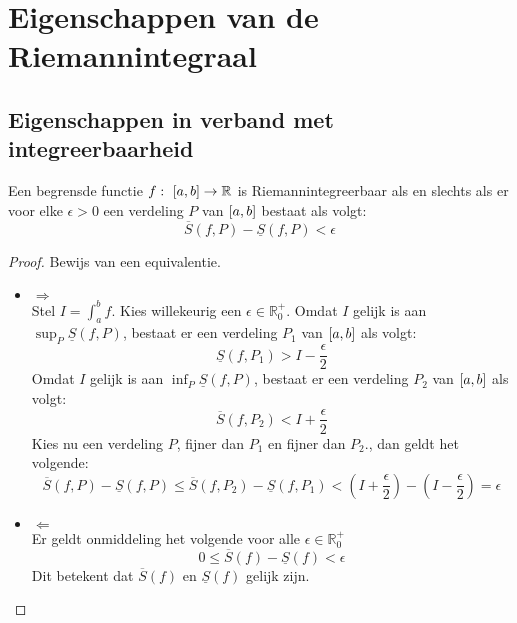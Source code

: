 \documentclass[main.tex]{subfiles}
\begin{document}
\section{Eigenschappen van de Riemannintegraal}
\label{sec:eigenschappen-van-de}

\subsection{Eigenschappen in verband met integreerbaarheid}
\label{sec:eigensch-verb-met}

\begin{bpr}
  \label{pr:integreerbaar-itv-verdelingen}
  Een begrensde functie $f:\ \interval{a}{b} \rightarrow \mathbb{R}$ is Riemannintegreerbaar als en slechts als er voor elke $\epsilon > 0$ een verdeling $P$ van $\interval{a}{b}$ bestaat als volgt:
  \[ \overline{S}(f,P) - \underline{S}(f,P) < \epsilon \]

  \begin{proof}
    Bewijs van een equivalentie.
    \begin{itemize}
    \item $\Rightarrow$\\
      Stel $I = \int_{a}^{b}f$.
      Kies willekeurig een $\epsilon\in\mathbb{R}_{0}^{+}$.
      Omdat $I$ gelijk is aan $\sup_{P}\underline{S}(f,P)$, bestaat er een verdeling $P_{1}$ van $\interval{a}{b}$ als volgt:
      \[ \underline{S}(f,P_{1}) > I-\frac{\epsilon}{2} \]
      Omdat $I$ gelijk is aan $\inf_{P}\underline{S}(f,P)$, bestaat er een verdeling $P_{2}$ van $\interval{a}{b}$ als volgt:
      \[ \overline{S}(f,P_{2}) < I+\frac{\epsilon}{2} \]
      Kies nu een verdeling $P$, fijner dan $P_{1}$ en fijner dan $P_{2}$., dan geldt het volgende:
      \[ \overline{S}(f,P) - \underline{S}(f,P) \le \overline{S}(f,P_{2}) - \underline{S}(f,P_{1}) < \left(I + \frac{\epsilon}{2}\right) - \left( I - \frac{\epsilon}{2} \right) = \epsilon \]
    \item $\Leftarrow$\\
      Er geldt onmiddeling het volgende voor alle $\epsilon\in\mathbb{R}_{0}^{+}$
      \[ 0 \le \overline{S}(f) - \underline{S}(f) < \epsilon \]
      Dit betekent dat $\overline{S}(f)$ en $\underline{S}(f)$ gelijk zijn.
    \end{itemize}
  \end{proof}
\end{bpr}
\end{document}
